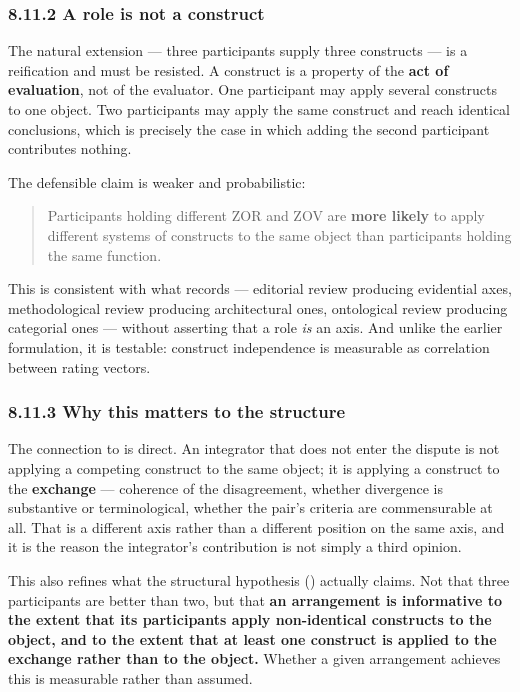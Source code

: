 \subsubsection*{8.11.2 A role is not a construct}
\label{sec:en:8.11.2}

The natural extension — three participants supply three constructs — is a reification and must be resisted. A construct is a property of the \textbf{act of evaluation}, not of the evaluator. One participant may apply several constructs to one object. Two participants may apply the same construct and reach identical conclusions, which is precisely the case in which adding the second participant contributes nothing.

The defensible claim is weaker and probabilistic:

\begin{quote}
Participants holding different ZOR and ZOV are \textbf{more likely} to apply different systems of constructs to the same object than participants holding the same function.
\end{quote}
This is consistent with what  records — editorial review producing evidential axes, methodological review producing architectural ones, ontological review producing categorial ones — without asserting that a role \emph{is} an axis. And unlike the earlier formulation, it is testable: construct independence is measurable as correlation between rating vectors.


\subsubsection*{8.11.3 Why this matters to the structure}
\label{sec:en:8.11.3}

The connection to  is direct. An integrator that does not enter the dispute is not applying a competing construct to the same object; it is applying a construct to the \textbf{exchange} — coherence of the disagreement, whether divergence is substantive or terminological, whether the pair's criteria are commensurable at all. That is a different axis rather than a different position on the same axis, and it is the reason the integrator's contribution is not simply a third opinion.

This also refines what the structural hypothesis () actually claims. Not that three participants are better than two, but that \textbf{an arrangement is informative to the extent that its participants apply non-identical constructs to the object, and to the extent that at least one construct is applied to the exchange rather than to the object.} Whether a given arrangement achieves this is measurable rather than assumed.


